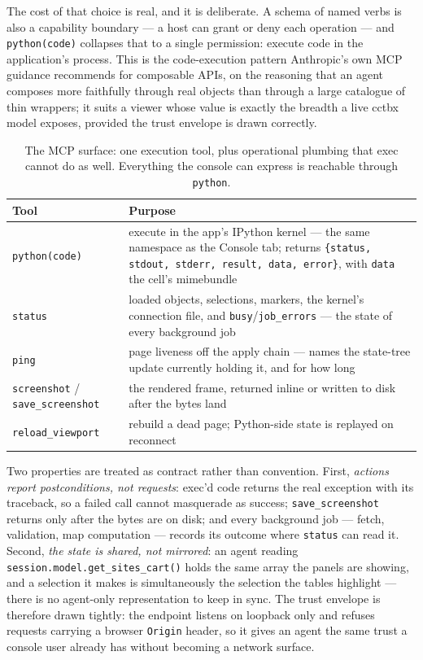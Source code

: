 \documentclass[11pt]{article}
\begin{document}
The cost of that choice is real, and it is deliberate. A schema of named
verbs is also a capability boundary --- a host can grant or deny each
operation --- and \texttt{python(code)} collapses that to a single
permission: execute code in the application's process. This is the
code-execution pattern Anthropic's own MCP guidance recommends for
composable APIs, on the reasoning that an agent composes more faithfully
through real objects than through a large catalogue of thin wrappers; it
suits a viewer whose value is exactly the breadth a live cctbx model
exposes, provided the trust envelope is drawn correctly.

\begin{table}[H]
\centering
\caption{The MCP surface: one execution tool, plus operational plumbing
that exec cannot do as well. Everything the console can express is
reachable through \texttt{python}.}
\label{tab:mcp}
\begin{tabular}{@{}lp{10.5cm}@{}}
\toprule
Tool & Purpose \\
\midrule
\texttt{python(code)} & execute in the app's IPython kernel --- the same
namespace as the Console tab; returns
\texttt{\{status, stdout, stderr, result, data, error\}}, with
\texttt{data} the cell's mimebundle \\
\texttt{status} & loaded objects, selections, markers, the kernel's
connection file, and \texttt{busy}/\texttt{job\_errors} --- the state of
every background job \\
\texttt{ping} & page liveness off the apply chain --- names the state-tree
update currently holding it, and for how long \\
\texttt{screenshot} / \texttt{save\_screenshot} & the rendered frame,
returned inline or written to disk after the bytes land \\
\texttt{reload\_viewport} & rebuild a dead page; Python-side state is
replayed on reconnect \\
\bottomrule
\end{tabular}
\end{table}

Two properties are treated as contract rather than convention. First,
\emph{actions report postconditions, not requests}: exec'd code returns
the real exception with its traceback, so a failed call cannot masquerade
as success; \texttt{save\_screenshot} returns only after the bytes are on
disk; and every background job --- fetch, validation, map computation ---
records its outcome where \texttt{status} can read it. Second, \emph{the
state is shared, not mirrored}: an agent reading
\texttt{session.model.get\_sites\_cart()} holds the same array the panels
are showing, and a selection it makes is simultaneously the selection the
tables highlight --- there is no agent-only representation to keep in
sync. The trust envelope is therefore drawn tightly: the endpoint listens
on loopback only and refuses requests carrying a browser \texttt{Origin}
header, so it gives an agent the same trust a console user already has
without becoming a network surface.
\end{document}
